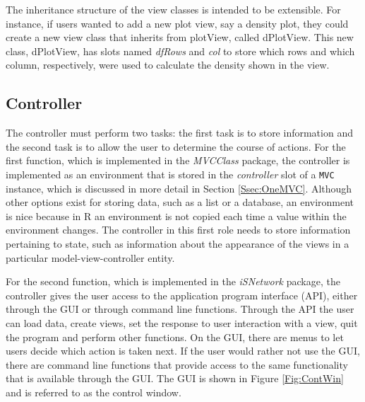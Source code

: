 \documentclass{article}[11pt]
\newcommand{\Robject}[1]{{\texttt{#1}}}
\newcommand{\Rpackage}[1]{{\textit{#1}}}
\newcommand{\Rslot}[1]{\textsl{#1}}
\newcommand{\Rclass}[1]{\textsf{#1}}
\begin{document}
The inheritance structure of the view classes is intended to be
extensible.  For instance, if users wanted to add a new plot view, say a
density plot, they could create a new view class that inherits from
\Rclass{plotView}, called \Rclass{dPlotView}.  This new class,
\Rclass{dPlotView}, has slots named \Rslot{dfRows} and \Rslot{col} to store
which rows and which column, respectively, were used to calculate the density
shown in the view.

\subsection{Controller}\label{Ssec:OneCont}

The controller must perform two tasks: the first task is to store information
and the second task is to allow the user to determine the course of actions.
For the first function, which is implemented in the \Rpackage{MVCClass}
package, the controller is implemented as an environment that is stored in the
\Rslot{controller} slot of a \Robject{MVC} instance, which is discussed in
more detail in Section \ref{Ssec:OneMVC}.  Although other options exist for
storing data, such as a list or a database, an environment is nice because in
R an environment is not copied each time a value within the environment
changes.  The controller in this first role needs to store information
pertaining to state, such as information about the appearance of the views in
a particular model-view-controller entity.

For the second function, which is implemented in the \Rpackage{iSNetwork}
package, the controller gives the user access to the application program
interface (API), either through the GUI or through command line functions.
Through the API the user can load data, create views, set the response to user
interaction with a view, quit the program and perform other functions.  On the
GUI, there are menus to let users decide which action is taken next.  If
the user would rather not use the GUI, there are command line functions that
provide access to the same functionality that is available through the GUI.
The GUI is shown in Figure \ref{Fig:ContWin} and is referred to as the
control window.
\end{document}
